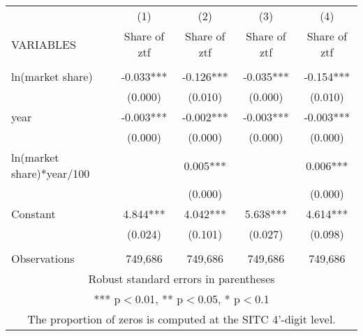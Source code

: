 \begin{tabular}{lcccc} \hline
 & (1) & (2) & (3) & (4) \\
VARIABLES & Share of ztf & Share of ztf & Share of ztf & Share of ztf \\ \hline
 &  &  &  &  \\
ln(market share) & -0.033*** & -0.126*** & -0.035*** & -0.154*** \\
 & (0.000) & (0.010) & (0.000) & (0.010) \\
year & -0.003*** & -0.002*** & -0.003*** & -0.003*** \\
 & (0.000) & (0.000) & (0.000) & (0.000) \\
ln(market share)*year/100 &  & 0.005*** &  & 0.006*** \\
 &  & (0.000) &  & (0.000) \\
Constant & 4.844*** & 4.042*** & 5.638*** & 4.614*** \\
 & (0.024) & (0.101) & (0.027) & (0.098) \\
 &  &  &  &  \\
 Observations & 749,686 & 749,686 & 749,686 & 749,686 \\ \hline
\multicolumn{5}{c}{ Robust standard errors in parentheses} \\
\multicolumn{5}{c}{ *** p$<$0.01, ** p$<$0.05, * p$<$0.1} \\
\multicolumn{5}{c}{ The proportion of zeros is computed at the SITC 4'-digit level.} \\
\end{tabular}
